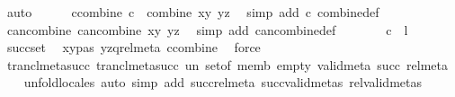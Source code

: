 \begin{isabellebody}
\ auto\isanewline
\ \ \ \ \isamarkupfalse%
\ c{\isacharunderscore}{\kern0pt}combine{\isacharcolon}{\kern0pt}\ {\isachardoublequoteopen}c\ {\isacharequal}{\kern0pt}\ combine\ {\isacharparenleft}{\kern0pt}x{\isacharcomma}{\kern0pt}y{\isacharparenright}{\kern0pt}\ {\isacharparenleft}{\kern0pt}y{\isacharcomma}{\kern0pt}z{\isacharparenright}{\kern0pt}{\isachardoublequoteclose}\ \isamarkupfalse%
\ {\isacharparenleft}{\kern0pt}simp\ add{\isacharcolon}{\kern0pt}\ c\ combine{\isacharunderscore}{\kern0pt}def{\isacharparenright}{\kern0pt}\isanewline
\ \ \ \ \isamarkupfalse%
\ can{\isacharunderscore}{\kern0pt}combine{\isacharcolon}{\kern0pt}\ {\isachardoublequoteopen}can{\isacharunderscore}{\kern0pt}combine\ {\isacharparenleft}{\kern0pt}x{\isacharcomma}{\kern0pt}y{\isacharparenright}{\kern0pt}\ {\isacharparenleft}{\kern0pt}y{\isacharcomma}{\kern0pt}z{\isacharparenright}{\kern0pt}{\isachardoublequoteclose}\ \isamarkupfalse%
\ {\isacharparenleft}{\kern0pt}simp\ add{\isacharcolon}{\kern0pt}\ can{\isacharunderscore}{\kern0pt}combine{\isacharunderscore}{\kern0pt}def{\isacharparenright}{\kern0pt}\isanewline
\ \ \ \ \isamarkupfalse%
\ \isamarkupfalse%
\ {\isachardoublequoteopen}c\ {\isasymin}\ {\isacharquery}{\kern0pt}l{\isachardoublequoteclose}\ \isamarkupfalse%
\ succ{\isacharunderscore}{\kern0pt}set\ \isamarkupfalse%
\ xy{\isacharunderscore}{\kern0pt}p{\isacharunderscore}{\kern0pt}as\ yz{\isacharunderscore}{\kern0pt}q{\isacharunderscore}{\kern0pt}rel{\isacharunderscore}{\kern0pt}meta\ c{\isacharunderscore}{\kern0pt}combine\ \isamarkupfalse%
\ force\isanewline
\ \ \isamarkupfalse%
\isanewline
{}\isamarkupfalse%
%
\endisatagproof
{\isafoldproof}%
%
\isadelimproof
\isanewline
%
\endisadelimproof
\isanewline
{}\isamarkupfalse%
\ trancl{\isacharunderscore}{\kern0pt}meta{\isacharunderscore}{\kern0pt}succ{\isacharcolon}{\kern0pt}\ trancl{\isacharunderscore}{\kern0pt}meta{\isacharunderscore}{\kern0pt}succ\ un\ set{\isacharunderscore}{\kern0pt}of\ memb\ empty\ valid{\isacharunderscore}{\kern0pt}meta\ succ\ rel{\isacharunderscore}{\kern0pt}meta\isanewline
%
\isadelimproof
\ \ %
\endisadelimproof
%
\isatagproof
{}\isamarkupfalse%
\ unfold{\isacharunderscore}{\kern0pt}locales\ {\isacharparenleft}{\kern0pt}auto\ simp\ add{\isacharcolon}{\kern0pt}\ succ{\isacharunderscore}{\kern0pt}rel{\isacharunderscore}{\kern0pt}meta\ succ{\isacharunderscore}{\kern0pt}valid{\isacharunderscore}{\kern0pt}metas\ rel{\isacharunderscore}{\kern0pt}valid{\isacharunderscore}{\kern0pt}metas{\isacharparenright}{\kern0pt}%

\end{isabellebody}

